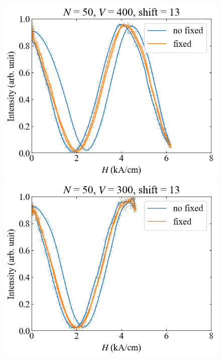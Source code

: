 \documentclass[9pt,dvipdfmx,a4paper]{jsarticle}
\begin{document}
\begin{figure}[H]
    \centering
    \begin{minipage}[t]{0.24\columnwidth}
        \centering
        \includegraphics[width = \columnwidth]{xy/13.png}
    \end{minipage}
    \hfill
    \begin{minipage}[t]{0.24\columnwidth}
        \centering
        \includegraphics[width = \columnwidth]{xy/14.png}
    \end{minipage}
    \hfill
    \begin{minipage}[t]{0.24\columnwidth}

\end{minipage}
\end{figure}
\end{document}
